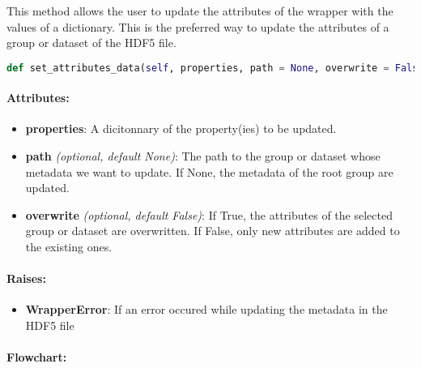 This method allows the user to update the attributes of the wrapper with the values of a dictionary. This is the preferred way to update the attributes of a group or dataset of the HDF5 file.

\begin{lstlisting}[language=Python]
def set_attributes_data(self, properties, path = None, overwrite = False):
\end{lstlisting}

\paragraph{Attributes:}

\begin{itemize}
    \item \textbf{properties}: A dicitonnary of the property(ies) to be updated.
    \item \textbf{path} \textit{(optional, default None)}: The path to the group or dataset whose metadata we want to update. If None, the metadata of the root group are updated.
    \item \textbf{overwrite} \textit{(optional, default False)}: If True, the attributes of the selected group or dataset are overwritten. If False, only new attributes are added to the existing ones.
\end{itemize}

\paragraph{Raises:}
\begin{itemize}
    \item \textbf{WrapperError}: If an error occured while updating the metadata in the HDF5 file
\end{itemize}


\paragraph{Flowchart:}

